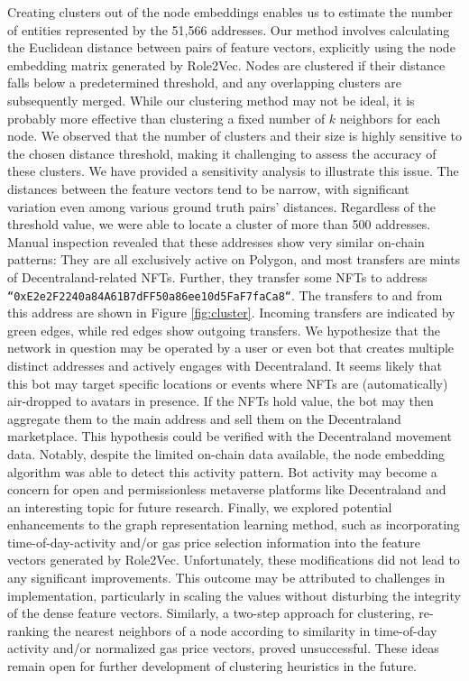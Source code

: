 \documentclass[12pt,a4paper,titlepage,oneside,english]{article}
\begin{document}
Creating clusters out of the node embeddings enables us to estimate the number of entities represented by the 51,566 addresses. Our method involves calculating the Euclidean distance between pairs of feature vectors, explicitly using the node embedding matrix generated by Role2Vec. Nodes are clustered if their distance falls below a predetermined threshold, and any overlapping clusters are subsequently merged. \newline 
While our clustering method may not be ideal, it is probably more effective than clustering a fixed number of $k$ neighbors for each node. We observed that the number of clusters and their size is highly sensitive to the chosen distance threshold, making it challenging to assess the accuracy of these clusters. We have provided a sensitivity analysis to illustrate this issue. The distances between the feature vectors tend to be narrow, with significant variation even among various ground truth pairs' distances. Regardless of the threshold value, we were able to locate a cluster of more than 500 addresses. Manual inspection revealed that these addresses show very similar on-chain patterns: They are all exclusively active on Polygon, and most transfers are mints of Decentraland-related NFTs. Further, they transfer some NFTs to address \texttt{``0xE2e2F2240a84A61B7dFF50a86ee10d5FaF7faCa8``}. The transfers to and from this address are shown in Figure \ref{fig:cluster}. Incoming transfers are indicated by green edges, while red edges show outgoing transfers. We hypothesize that the network in question may be operated by a user or even bot that creates multiple distinct addresses and actively engages with Decentraland. It seems likely that this bot may target specific locations or events where NFTs are (automatically) air-dropped to avatars in presence. If the NFTs hold value, the bot may then aggregate them to the main address and sell them on the Decentraland marketplace. This hypothesis could be verified with the Decentraland movement data. \newline
Notably, despite the limited on-chain data available, the node embedding algorithm was able to detect this activity pattern. Bot activity may become a concern for open and permissionless metaverse platforms like Decentraland and an interesting topic for future research. \newline
Finally, we explored potential enhancements to the graph representation learning method, such as incorporating time-of-day-activity and/or gas price selection information into the feature vectors generated by Role2Vec. Unfortunately, these modifications did not lead to any significant improvements. This outcome may be attributed to challenges in implementation, particularly in scaling the values without disturbing the integrity of the dense feature vectors.  
Similarly, a two-step approach for clustering, re-ranking the nearest neighbors of a node according to similarity in time-of-day activity and/or normalized gas price vectors, proved unsuccessful. These ideas remain open for further development of clustering heuristics in the future.
\end{document}
